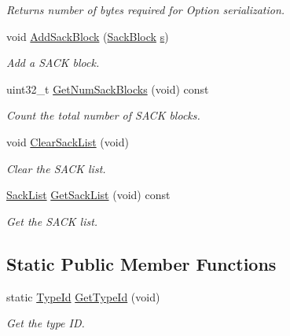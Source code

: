 \begin{DoxyCompactItemize}
\begin{DoxyCompactList}\small\item\em Returns number of bytes required for Option serialization. \end{DoxyCompactList}\item 
void \hyperlink{classns3_1_1TcpOptionSack_ab7fe631445815bbb5f5bd2e7d6fd2662}{Add\+Sack\+Block} (\hyperlink{classns3_1_1TcpOptionSack_a9e1d07d8729fd3ac5ead7305794675c3}{Sack\+Block} \hyperlink{generate__test__data__lte__sinr_8m_ad83eeb3a142285d1243a08c6b7026df8}{s})
\begin{DoxyCompactList}\small\item\em Add a S\+A\+CK block. \end{DoxyCompactList}\item 
uint32\+\_\+t \hyperlink{classns3_1_1TcpOptionSack_a4700d3fed6cd67def0c18ce47298e767}{Get\+Num\+Sack\+Blocks} (void) const 
\begin{DoxyCompactList}\small\item\em Count the total number of S\+A\+CK blocks. \end{DoxyCompactList}\item 
void \hyperlink{classns3_1_1TcpOptionSack_ab5f3634e6e86fa9df061596696d130c5}{Clear\+Sack\+List} (void)
\begin{DoxyCompactList}\small\item\em Clear the S\+A\+CK list. \end{DoxyCompactList}\item 
\hyperlink{classns3_1_1TcpOptionSack_a2aa2d721c71424680d79ebaa079f264a}{Sack\+List} \hyperlink{classns3_1_1TcpOptionSack_a08840a554682aeb3aadbccfbb1f6b6fa}{Get\+Sack\+List} (void) const 
\begin{DoxyCompactList}\small\item\em Get the S\+A\+CK list. \end{DoxyCompactList}\end{DoxyCompactItemize}
\subsection*{Static Public Member Functions}
\begin{DoxyCompactItemize}
\item 
static \hyperlink{classns3_1_1TypeId}{Type\+Id} \hyperlink{classns3_1_1TcpOptionSack_aeb9873e8c3994c962dec993f14fc12f0}{Get\+Type\+Id} (void)
\begin{DoxyCompactList}\small\item\em Get the type ID. \end{DoxyCompactList}\end{DoxyCompactItemize}
